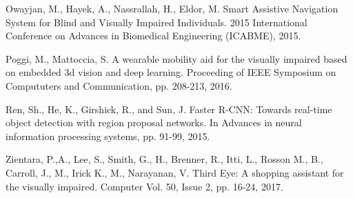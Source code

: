 \documentclass[10pt,conference,compsocconf]{IEEEtran}
\begin{document}
\begin{thebibliography}{1}
 Owayjan, M., Hayek, A., Nassrallah, H., Eldor, M. Smart Assistive Navigation System for Blind and Visually Impaired Individuals. 2015 International Conference on Advances in Biomedical Engineering (ICABME), 2015.

 Poggi, M., Mattoccia, S. A wearable mobility aid for the visually impaired based on embedded 3d vision and deep learning. Proceeding of IEEE Symposium on Compututers and Communication, pp. 208-213, 2016.

 Ren, Sh., He, K., Girshick, R., and Sun, J.  Faster R-CNN: Towards real-time object detection with region proposal networks. In Advances in neural information processing systems, pp. 91-99, 2015.

 Zientara, P.,A., Lee, S., Smith, G., H., Brenner, R., Itti, L., Rosson M., B., Carroll, J., M., Irick K., M., Narayanan, V. Third Eye: A shopping assistant for the visually impaired. Computer Vol. 50, Issue 2, pp. 16-24, 2017.



\end{thebibliography}




\end{document}
